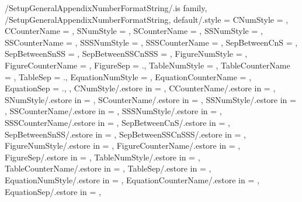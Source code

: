 
\pgfkeys
{
  /SetupGeneralAppendixNumberFormatString/.is family, /SetupGeneralAppendixNumberFormatString,
  default/.style =
  {
    CNumStyle = \empty,
    CCounterName = \empty,
    SNumStyle = \empty,
    SCounterName = \empty,
    SSNumStyle = \empty,
    SSCounterName = \empty,
    SSSNumStyle = \empty,
    SSSCounterName = \empty,
    SepBetweenCnS = \empty,
    SepBetweenSnSS = \empty,
    SepBetweenSSCnSSS = \empty,
    FigureNumStyle = \empty,
    FigureCounterName = \empty,
    FigureSep = {.},
    TableNumStyle = \empty,
    TableCounterName = \empty,
    TableSep = {.},
    EquationNumStyle = \empty,
    EquationCounterName = \empty,
    EquationSep = {.},
  },
  CNumStyle/.estore in = \TmpValueCNumStyle,
  CCounterName/.estore in = \TmpValueCCounterName,
  SNumStyle/.estore in = \TmpValueSNumStyle,
  SCounterName/.estore in = \TmpValueSCounterName,
  SSNumStyle/.estore in = \TmpValueSSNumStyle,
  SSCounterName/.estore in = \TmpValueSSCounterName,
  SSSNumStyle/.estore in = \TmpValueSSSNumStyle,
  SSSCounterName/.estore in = \TmpValueSSSCounterName,
  SepBetweenCnS/.estore in = \TmpValueSepBetweenCnS,
  SepBetweenSnSS/.estore in = \TmpValueSepBetweenSnSS,
  SepBetweenSSCnSSS/.estore in = \TmpValueSepBetweenSSCnSSS,
  FigureNumStyle/.estore in = \TmpValueFigureNumStyle,
  FigureCounterName/.estore in = \TmpValueFigureCounterName,
  FigureSep/.estore in = \TmpValueFigureSep,
  TableNumStyle/.estore in = \TmpValueTableNumStyle,
  TableCounterName/.estore in = \TmpValueTableCounterName,
  TableSep/.estore in = \TmpValueTableSep,
  EquationNumStyle/.estore in = \TmpValueEquationNumStyle,
  EquationCounterName/.estore in = \TmpValueEquationCounterName,
  EquationSep/.estore in = \TmpValueEquationSep,
} %

